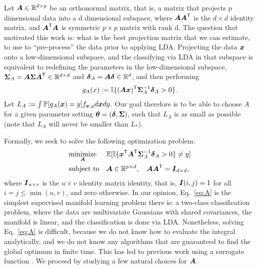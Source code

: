 \documentclass[10pt]{article}
\begin{document}
Let $\boldsymbol{A} \in \mathbb{R}^{d \times p}$ be an orthonormal matrix, that is, a matrix that projects p dimensional data into a d dimensional subspace, where $\boldsymbol{A}\boldsymbol{A}^{\mathsf{T}}$ is the $d \times d$ identity matrix, and $\boldsymbol{A}^{\mathsf{T}} \boldsymbol{A}$ is symmetric $p \times p$ matrix with rank d.   The question that motivated this work is: what is the best projection matrix that we can estimate, to use to ``pre-process'' the data prior to applying LDA.  
Projecting the data $\boldsymbol{x}$ onto a low-dimensional subspace, and the classifying via LDA in that subspace is equivalent to redefining the parameters in the low-dimensional subspace, 
$\boldsymbol{\Sigma}_A=\boldsymbol{A} \boldsymbol{\Sigma} \boldsymbol{A}^{\mathsf{T}} \in \mathbb{R}^{d \times d}$ and $\boldsymbol{\delta}_A = \boldsymbol{A} \boldsymbol{\delta} \in \mathbb{R}^d$, and then performing
\begin{align} \label{eq:g_A}
g_A(x) := \mathbb{I} \{ (\boldsymbol{A} \boldsymbol{x})^{\mathsf{T}} \boldsymbol{\Sigma}^{-1}_A \boldsymbol{\delta}_A > 0\}.
\end{align}
Let $L_A :=\int \mathbb{P}[g_A(\boldsymbol{x})=y] f_{\boldsymbol{x},y} d\boldsymbol{x} dy$.
Our goal therefore is to be able to choose $A$ for a given parameter setting $\boldsymbol{\theta}=(\boldsymbol{\delta},\boldsymbol{\Sigma})$, such that $L_A$ is as small as possible (note that $L_A$ will never be smaller than $L_*$).  

Formally, we seek to solve the following optimization problem:
\begin{equation} \label{eq:A}
\begin{aligned}
& \underset{\boldsymbol{A}}{\text{minimize}}
& & \mathbb{E} [ \mathbb{I} \{ \boldsymbol{x}^{\mathsf{T}} \boldsymbol{A}^{\mathsf{T}} \boldsymbol{\Sigma}^{-1}_A \boldsymbol{\delta}_A > 0\} \neq y] \\
& \text{subject to} & & \boldsymbol{A} \in \mathbb{R}^{p \times d}, \quad \boldsymbol{A} \boldsymbol{A}^{\mathsf{T}} = \boldsymbol{I}_{d \times d},
\end{aligned}
\end{equation}
where $\boldsymbol{I}_{u \times v}$ is the $u \times v$ identity matrix identity, that is, $\boldsymbol{I}(i,j)=1$ for all $i=j \leq \min(u,v)$, and zero otherwise. In our opinion, Eq.~\eqref{eq:A} is the simplest supervised manifold learning problem there is: a two-class classification problem, where the data are multivariate Gaussians with shared covariances, the manifold is linear, and the classification is done via LDA.
Nonetheless, solving Eq.~\eqref{eq:A} is difficult, because we do not know how to evaluate the integral analytically, and we do not know any algorithms that are guaranteed to find the global optimum in finite time.  This has led to previous work using a surrogate function \cite{not sure who}.  
We proceed by studying a few natural choices for $\boldsymbol{A}$.
\end{document}
